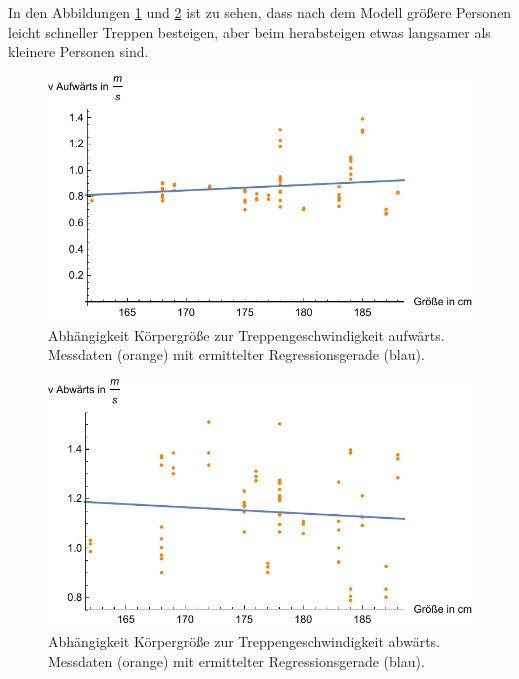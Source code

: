 In den Abbildungen \ref{fig:auf-groesse} und \ref{fig:ab-groesse} ist 
zu sehen, dass nach dem Modell größere Personen leicht schneller Treppen besteigen, aber beim herabsteigen etwas langsamer als kleinere
Personen sind. 

\begin{figure} \centering 
	\includegraphics[]{abbildungen/regression/2017/auf-groesse.pdf}
	
	\caption{Abhängigkeit Körpergröße zur Treppengeschwindigkeit aufwärts. Messdaten (orange) mit ermittelter Regressionsgerade (blau). \label{fig:auf-groesse}}
\end{figure}

\begin{figure} \centering 
	\includegraphics[]{abbildungen/regression/2017/ab-groesse.pdf}
	
	\caption{Abhängigkeit Körpergröße zur Treppengeschwindigkeit abwärts. Messdaten (orange) mit ermittelter Regressionsgerade (blau). \label{fig:ab-groesse}}
\end{figure}

